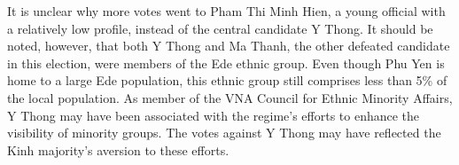 \documentclass[12pt]{article}
\newcommand{\1}{\mathbbm{1}}
\begin{document}
It is unclear why more votes went to Pham Thi Minh Hien, a young official with a relatively low profile, instead of the central candidate Y Thong. It should be noted, however, that both Y Thong and Ma Thanh, the other defeated candidate in this election, were members of the Ede ethnic group. Even though Phu Yen is home to a large Ede population, this ethnic group still comprises less than 5\% of the local population. As member of the VNA Council for Ethnic Minority Affairs, Y Thong may have been associated with the regime's efforts to enhance the visibility of minority groups. The votes against Y Thong may have reflected the Kinh majority's aversion to these efforts.

\begin{table}[htb]
	\caption{Candidate profiles and election results, Phu Yen's first electoral district}
	\label{tab:results_PhuYen}
\end{table}
\end{document}
